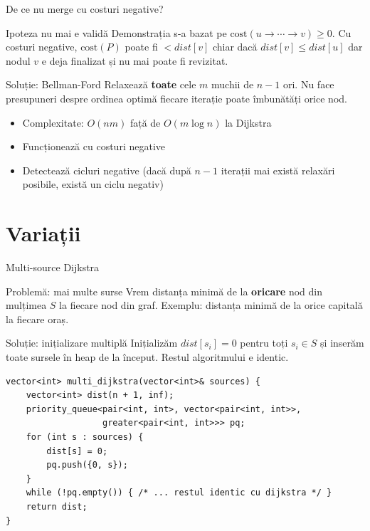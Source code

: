 \documentclass[10pt]{beamer}
\begin{document}
\begin{frame}{De ce nu merge cu costuri negative?}
  \begin{block}{Ipoteza nu mai e validă}
    Demonstrația s-a bazat pe $\text{cost}(u \to \cdots \to v) \geq 0$.
    Cu costuri negative, $\text{cost}(P)$ poate fi $< dist[v]$
    chiar dacă $dist[v] \leq dist[u]$ \textemdash{} dar nodul $v$ e deja
    finalizat și nu mai poate fi revizitat.
  \end{block}

  \smallskip
  \begin{block}{Soluție: Bellman-Ford}
    Relaxează \textbf{toate} cele $m$ muchii de $n-1$ ori.
    Nu face presupuneri despre ordinea optimă \textemdash{} fiecare iterație
    poate îmbunătăți orice nod.
    \begin{itemize}
      \item Complexitate: $O(nm)$ față de $O(m \log n)$ la Dijkstra
      \item Funcționează cu costuri negative
      \item Detectează cicluri negative (dacă după $n-1$ iterații
            mai există relaxări posibile, există un ciclu negativ)
    \end{itemize}
  \end{block}
\end{frame}

\section{Variații}

\begin{frame}{Multi-source Dijkstra}
  \begin{block}{Problemă: mai multe surse}
    Vrem distanța minimă de la \textbf{oricare} nod din mulțimea $S$
    la fiecare nod din graf.
    Exemplu: distanța minimă de la orice capitală la fiecare oraș.
  \end{block}

  \begin{block}{Soluție: inițializare multiplă}
    Inițializăm $dist[s_i] = 0$ pentru toți $s_i \in S$
    și inserăm toate sursele în heap de la început.
    Restul algoritmului e identic.
  \end{block}

\begin{lstlisting}
vector<int> multi_dijkstra(vector<int>& sources) {
    vector<int> dist(n + 1, inf);
    priority_queue<pair<int, int>, vector<pair<int, int>>,
                   greater<pair<int, int>>> pq;
    for (int s : sources) {
        dist[s] = 0;
        pq.push({0, s});
    }
    while (!pq.empty()) { /* ... restul identic cu dijkstra */ }
    return dist;
}
\end{lstlisting}
\end{frame}
\end{document}
